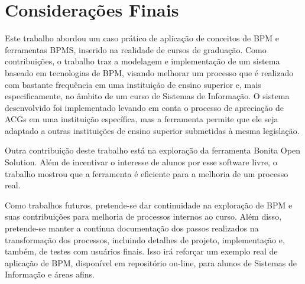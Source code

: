 \documentclass[12pt]{article}
\begin{document}
\section{Considerações Finais}

Este trabalho abordou um caso prático de aplicação de conceitos de BPM e ferramentas BPMS, inserido na realidade de cursos de graduação. Como contribuições, o trabalho traz a modelagem e implementação de um sistema baseado em tecnologias de BPM, visando melhorar um processo que é realizado com bastante frequência em uma instituição de ensino superior e, mais especificamente, no âmbito de um curso de Sistemas de Informação. O sistema desenvolvido foi implementado levando em conta o processo de apreciação de ACGs em uma instituição específica, mas a ferramenta permite que ele seja adaptado a outras instituições de ensino superior submetidas à mesma legislação.

Outra contribuição deste trabalho está na exploração da ferramenta Bonita Open Solution. Além de incentivar o interesse de alunos por esse software livre, o trabalho mostrou que a ferramenta é eficiente para a melhoria de um processo real.

Como trabalhos futuros, pretende-se dar continuidade na exploração de BPM e suas contribuições para melhoria de processos internos ao curso. Além disso, pretende-se manter a contínua documentação dos passos realizados na transformação dos processos, incluindo detalhes de projeto, implementação e, também, de testes com usuários finais. Isso irá reforçar um exemplo real de aplicação de BPM, disponível em repositório on-line, para alunos de Sistemas de Informação e áreas afins.




\end{document}
